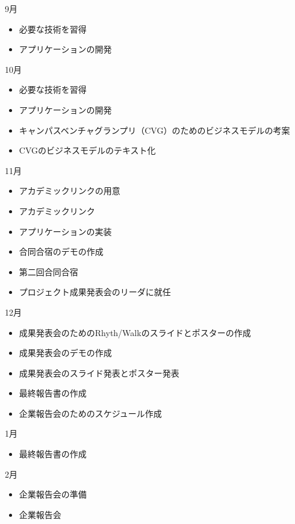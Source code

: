9月
\begin{itemize}
\item 必要な技術を習得
\item アプリケーションの開発
\end{itemize}
10月
\begin{itemize}
\item 必要な技術を習得
\item アプリケーションの開発
\item キャンパスベンチャグランプリ（CVG）のためのビジネスモデルの考案
\item CVGのビジネスモデルのテキスト化
\end{itemize}
11月
\begin{itemize}
\item アカデミックリンクの用意
\item アカデミックリンク
\item アプリケーションの実装
\item 合同合宿のデモの作成
\item 第二回合同合宿
\item プロジェクト成果発表会のリーダに就任
\end{itemize}
12月
\begin{itemize}
\item 成果発表会のためのRhyth/Walkのスライドとポスターの作成
\item 成果発表会のデモの作成
\item 成果発表会のスライド発表とポスター発表
\item 最終報告書の作成
\item 企業報告会のためのスケジュール作成
\end{itemize}
1月
\begin{itemize}
\item 最終報告書の作成
\end{itemize}
2月
\begin{itemize}
\item 企業報告会の準備
\item 企業報告会
\end{itemize}
